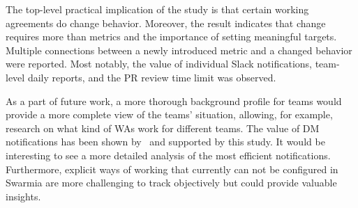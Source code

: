 The top-level practical implication of the study is that certain working agreements do change behavior. Moreover, the result indicates that change requires more than metrics and the importance of setting meaningful targets. Multiple connections between a newly introduced metric and a changed behavior were reported. Most notably, the value of individual Slack notifications, team-level daily reports, and the PR review time limit was observed. 

As a part of future work, a more thorough background profile for teams would provide a more complete view of the teams' situation, allowing, for example, research on what kind of WAs work for different teams. The value of DM notifications has been shown by~\citet{maddila_nudge_2022} and supported by this study. It would be interesting to see a more detailed analysis of the most efficient notifications. Furthermore, explicit ways of working that currently can not be configured in Swarmia are more challenging to track objectively but could provide valuable insights.